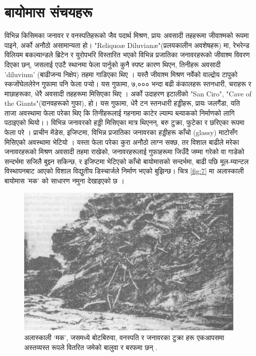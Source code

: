 \documentclass[10pt,twocolumn,letterpaper]{article}
\begin{document}
\section{बायोमास संचयहरू}

विभिन्न किसिमका जनावर र वनस्पतिहरूको जैव पदार्थ मिश्रण, प्रायः अवसादी तहहरूमा जीवाश्मको रूपमा पाइने, अर्को अनौठो असामान्यता हो। "Reliquoæ Diluvianæ"(प्रलयकालीन अवशेषहरू) मा, रेभरेन्ड विलियम बकल्यान्डले ब्रिटेन र युरोपभरि विस्तारित भएको विभिन्न प्रजातिका जनावरहरूको जीवाश्म विवरण दिएका छन्, जसलाई एउटै स्थानमा फेला पार्नुको कुनै स्पष्ट कारण थिएन, तिनीहरू अवसादी 'diluvium' (बाढीजन्य निक्षेप) तहमा गाडिएका थिए \cite{58}। यस्तै जीवाश्म मिश्रण नर्वेको वाल्द्रोय टापुको स्कजोंघेललेरेन गुफामा पनि फेला पर्‍यो। यस गुफामा, ७,००० भन्दा बढी कंकालहरू स्तनधारी, चराहरू र माछाहरूका, धेरै अवसादी तहहरूमा मिसिएका थिए \cite{59}। अर्को उदाहरण इटालीको "San Ciro", "Cave of the Giants"(दानवहरूको गुफा), हो। यस गुफामा, धेरै टन स्तनधारी हड्डीहरू, प्रायः जलगैंडा, यति ताजा अवस्थामा फेला परेका थिए कि तिनीहरूलाई गहनामा काटेर ल्याम्प ब्ल्याकको निर्माणको लागि पठाइएको थियो।। विभिन्न जनावरको हड्डी मिसिएका मात्र थिएनन्, बरु टुक्रा, फुटेका र छरिएका रूपमा फेला परे \cite{60,61}। प्राचीन मेंडेस, इजिप्टमा, विभिन्न प्रजातिका जनावरका हड्डीहरू काँचो (glassy) माटोसँग मिसिएको अवस्थामा भेटियो \cite{57}। यस्ता फेला परेका कुरा अनौठो लाग्न सक्छ, तर विशाल बाढीले मरेका जनावरहरूको मिश्रण  अवसादी तहमा राखेको, जनावरहरूलाई गुफाहरूमा जिउँदै जम्मा गरेको वा गाडेको सन्दर्भमा सजिलै बुझ्न सकिन्छ, र इजिप्टमा भेटिएको काँचो बायोमासको सन्दर्भमा, बाढी पछि मूल-म्यान्टल विस्थापनबाट आएको विशाल विद्युतीय डिस्चार्जले निर्माण भएको बुझिन्छ। चित्र \ref{fig:7} मा अलास्काली बायोमास 'मक' को साधारण नमुना देखाइएको छ \cite{56}।
\begin{figure}[t]
\begin{center}
   \includegraphics[width=1\linewidth]{muck-crop.jpeg}
\end{center}
   \caption{अलास्काली ‘मक’, जसमध्ये बोटबिरुवा, वनस्पति र जनावरका टुक्रा हरू एकआपसमा अस्तव्यस्त रूपले वितरित जमेको बालुवा र बरफमा छन् \cite{146}.}
\label{fig:7}
\label{fig:onecol}
\end{figure}
\end{document}
